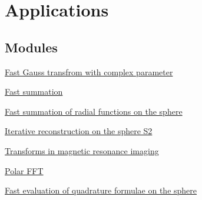 \hypertarget{group__applications}{
\section{Applications}
\label{group__applications}
}
\subsection*{Modules}
\begin{CompactItemize}
\item 
\hyperlink{group__applications__fastgauss}{Fast Gauss transfrom with complex parameter}
\item 
\hyperlink{group__applications__fastsum}{Fast summation}
\item 
\hyperlink{group__applications__fastsumS2}{Fast summation of radial functions on the sphere}
\item 
\hyperlink{group__applications__iterS2}{Iterative reconstruction on the sphere S2}
\item 
\hyperlink{group__applications__mri}{Transforms in magnetic resonance imaging}
\item 
\hyperlink{group__applications__polarFFT}{Polar FFT}
\item 
\hyperlink{group__applications__quadratureS2}{Fast evaluation of quadrature formulae on the sphere}
\end{CompactItemize}
